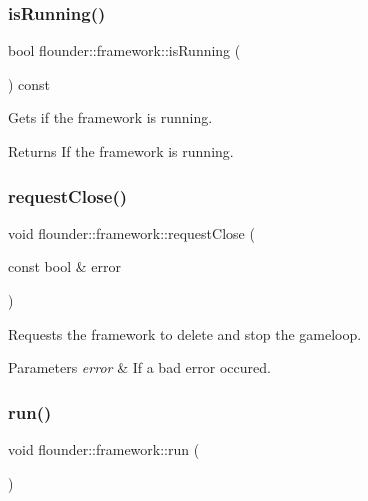 \subsubsection{\texorpdfstring{is\+Running()}{isRunning()}}
{\footnotesize\ttfamily bool flounder\+::framework\+::is\+Running (\begin{DoxyParamCaption}{ }\end{DoxyParamCaption}) const\hspace{0.3cm}{\ttfamily [inline]}}



Gets if the framework is running. 

\begin{DoxyReturn}{Returns}
If the framework is running. 
\end{DoxyReturn}
\mbox{\label{classflounder_1_1framework_ad443bf70cbc62d372cf39939cd7c2e09}} 
\subsubsection{\texorpdfstring{request\+Close()}{requestClose()}}
{\footnotesize\ttfamily void flounder\+::framework\+::request\+Close (\begin{DoxyParamCaption}\item[{const bool \&}]{error }\end{DoxyParamCaption})}



Requests the framework to delete and stop the gameloop. 


\begin{DoxyParams}{Parameters}
{\em error} & If a bad error occured. \\
\hline
\end{DoxyParams}
\mbox{\label{classflounder_1_1framework_aa3a73c8e8f5f0c6ccef3e4de89982434}} 
\subsubsection{\texorpdfstring{run()}{run()}}
{\footnotesize\ttfamily void flounder\+::framework\+::run (\begin{DoxyParamCaption}{ }\end{DoxyParamCaption})}




